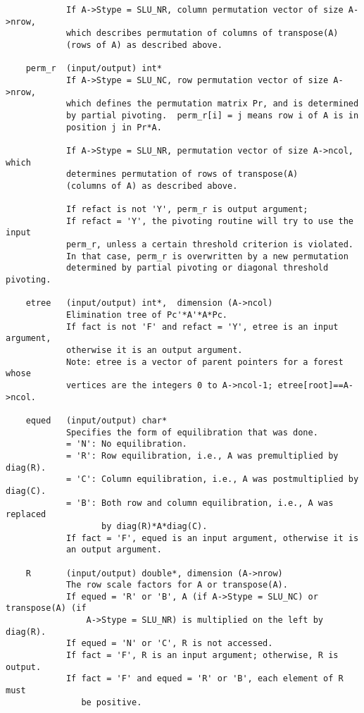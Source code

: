\begin{verbatim}
            If A->Stype = SLU_NR, column permutation vector of size A->nrow,
            which describes permutation of columns of transpose(A) 
            (rows of A) as described above.
    
    perm_r  (input/output) int*
            If A->Stype = SLU_NC, row permutation vector of size A->nrow, 
            which defines the permutation matrix Pr, and is determined
            by partial pivoting.  perm_r[i] = j means row i of A is in 
            position j in Pr*A.
   
            If A->Stype = SLU_NR, permutation vector of size A->ncol, which
            determines permutation of rows of transpose(A)
            (columns of A) as described above.
   
            If refact is not 'Y', perm_r is output argument;
            If refact = 'Y', the pivoting routine will try to use the input
            perm_r, unless a certain threshold criterion is violated.
            In that case, perm_r is overwritten by a new permutation
            determined by partial pivoting or diagonal threshold pivoting.
    
    etree   (input/output) int*,  dimension (A->ncol)
            Elimination tree of Pc'*A'*A*Pc.
            If fact is not 'F' and refact = 'Y', etree is an input argument,
            otherwise it is an output argument.
            Note: etree is a vector of parent pointers for a forest whose
            vertices are the integers 0 to A->ncol-1; etree[root]==A->ncol.
   
    equed   (input/output) char*
            Specifies the form of equilibration that was done.
            = 'N': No equilibration.
            = 'R': Row equilibration, i.e., A was premultiplied by diag(R).
            = 'C': Column equilibration, i.e., A was postmultiplied by diag(C).
            = 'B': Both row and column equilibration, i.e., A was replaced 
                   by diag(R)*A*diag(C).
            If fact = 'F', equed is an input argument, otherwise it is
            an output argument.
   
    R       (input/output) double*, dimension (A->nrow)
            The row scale factors for A or transpose(A).
            If equed = 'R' or 'B', A (if A->Stype = SLU_NC) or transpose(A) (if
                A->Stype = SLU_NR) is multiplied on the left by diag(R).
            If equed = 'N' or 'C', R is not accessed.
            If fact = 'F', R is an input argument; otherwise, R is output.
            If fact = 'F' and equed = 'R' or 'B', each element of R must
               be positive.
    

\end{verbatim}
